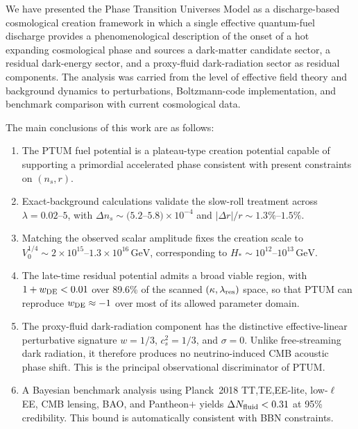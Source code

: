 \documentclass[epj]{svjour}
\begin{document}
We have presented the Phase Transition Universes Model as a
discharge-based cosmological creation framework in which a single
effective quantum-fuel discharge provides a phenomenological description
of the onset of a hot expanding cosmological phase and sources a
dark-matter candidate sector, a residual dark-energy sector, and a
proxy-fluid dark-radiation sector as residual components. The analysis was carried from the
level of effective field theory and background dynamics to
perturbations, Boltzmann-code implementation, and benchmark comparison
with current cosmological data.

The main conclusions of this work are as follows:

\begin{enumerate}[label=(\arabic*)]
\item The PTUM fuel potential is a plateau-type creation potential
      capable of supporting a primordial accelerated phase
      consistent with present constraints on $(n_s,r)$.

\item Exact-background calculations validate the slow-roll treatment
      across $\lambda=0.02$--$5$, with
      $\Delta n_s\sim(5.2$--$5.8)\times10^{-4}$ and
      $|\Delta r|/r\sim1.3\%$--$1.5\%$.

\item Matching the observed scalar amplitude fixes the creation
      scale to
      $V_0^{1/4}\sim 2\times10^{15}$--$1.3\times10^{16}\,
      \mathrm{GeV}$, corresponding to
      $H_*\sim10^{12}$--$10^{13}\,\mathrm{GeV}$.

\item The late-time residual potential admits a broad viable region,
      with $1+w_{\rm DE}<0.01$ over 89.6\% of the scanned
      $(\kappa,\lambda_{\rm res})$ space, so that PTUM can
      reproduce $w_{\rm DE}\approx -1$ over most of its allowed
      parameter domain.

\item The proxy-fluid dark-radiation component has the distinctive
      effective-linear perturbative signature
      $w=1/3$, $c_s^2=1/3$, and $\sigma=0$. Unlike free-streaming
      dark radiation, it therefore produces no neutrino-induced CMB
      acoustic phase shift. This is the principal observational
      discriminator of PTUM.

\item A Bayesian benchmark analysis using Planck~2018 TT,TE,EE-lite,
      low-$\ell$ EE, CMB lensing, BAO, and Pantheon$+$ yields
      $\Delta N_{\rm fluid}<0.31$ at 95\% credibility. This bound
      is automatically consistent with BBN constraints.


\end{enumerate}
\end{document}
